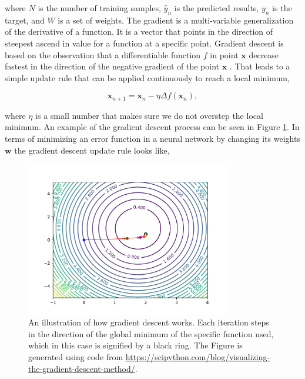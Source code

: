 where $N$ is the number of training samples, $\hat{y}_n$ is the predicted
results, $y_n$ is the target, and $W$ is a set of weights. The gradient is
a multi-variable generalization of the derivative of a function. It is a
vector that points in the direction of steepest ascend in value for a function
at a specific point. Gradient descent is based on the observation that a
differentiable function $f$ in point $\mathbf{x}$ decrease fastest in the
direction of the negative gradient of the point $\mathbf{x}$ \citep{Bishop}.
That leads to a simple update rule that can be applied continuously to reach a
local minimum,

\begin{equation}
    \mathbf{x}_{n+1} = \mathbf{x}_n - \eta \Delta f\left(\mathbf{x}_n\right),
\end{equation}

where $\eta$ is a small number that makes sure we do not overstep the local
minimum. An example of the gradient descent process can be seen in Figure
\ref{fig:gradient_descent}. In terms of minimizing an error function in a neural
network by changing its weights $\mathbf{w}$ the gradient descent update rule
looks like,

\begin{figure}
    \centering
    \includegraphics[width=0.8\textwidth]{./pictures/method/gradient_descend}
    \caption{An illustration of how gradient descent works. Each iteration steps
        in the direction of the global minimum of the specific function used,
        which in this case is signified by a black ring. The Figure is generated
        using code from
        \url{https://scipython.com/blog/visualizing-the-gradient-descent-method/}.}
    \label{fig:gradient_descent}
\end{figure}

